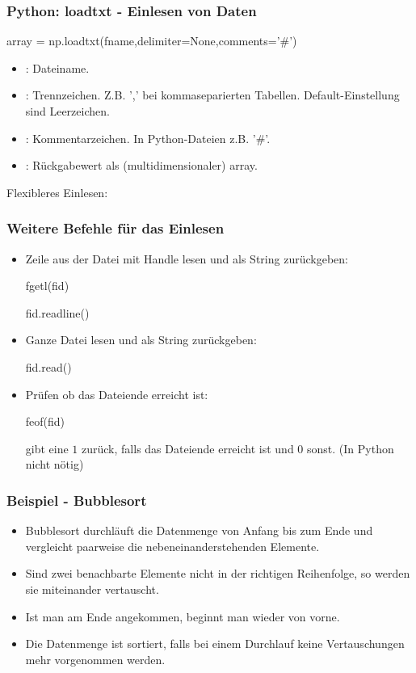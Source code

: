 \documentclass[hyperref={xetex}]{beamer}
\begin{document}
%
%
\begin{frame}[fragile]\frametitle{Python: loadtxt - Einlesen von Daten}
\begin{pyin}
array = np.loadtxt(fname,delimiter=None,comments='#')
\end{pyin}
\begin{itemize}
  \item {}: Dateiname. 
  \item {}: Trennzeichen. Z.B. ',' bei kommaseparierten Tabellen. Default-Einstellung sind Leerzeichen.
  \item {}: Kommentarzeichen. In Python-Dateien z.B. '\#'.
  \item {}: Rückgabewert als (multidimensionaler) array.
\end{itemize}
Flexibleres Einlesen: 
\end{frame}
%
%
\begin{frame}[fragile]\frametitle{Weitere Befehle für das Einlesen}
\begin{itemize}
\item Zeile aus der Datei mit  Handle  lesen und als String zurückgeben:
\begin{matlabin}
fgetl(fid) 
\end{matlabin}
  \begin{pyin}
fid.readline()
  \end{pyin}
\item Ganze Datei lesen und als String zurückgeben:
  \begin{pyin}
fid.read()
  \end{pyin}
\item Prüfen ob das Dateiende erreicht ist:
\begin{matlabin}
feof(fid)
\end{matlabin}
 gibt eine $1$
  zurück, falls das Dateiende erreicht ist und $0$ sonst. (In Python nicht nötig)
\end{itemize}
\end{frame}
%
%
\begin{frame}[fragile]\frametitle{Beispiel - Bubblesort}
\begin{itemize}
\item Bubblesort durchläuft die Datenmenge von Anfang bis zum Ende und
vergleicht paarweise die nebeneinanderstehenden Elemente. 
\item Sind zwei
benachbarte Elemente nicht in der richtigen Reihenfolge, so werden sie
miteinander vertauscht. 
\item Ist man am Ende angekommen, beginnt man wieder
von vorne. 
\item Die Datenmenge ist sortiert, falls bei einem Durchlauf
keine Vertauschungen mehr vorgenommen werden.
\end{itemize} 
\end{frame}
\end{document}
